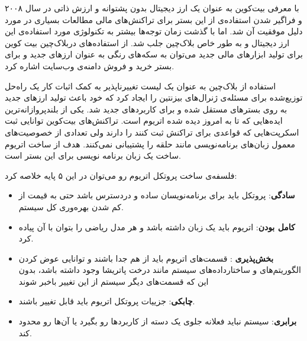 \par
با معرفی بیت‌کوین 
به عنوان یک ارز دیجیتال بدون پشتوانه و ارزش ذاتی در سال ۲۰۰۸ و فراگیر شدن استفاده‌ی از این بستر برای تراکنش‌های مالی مطالعات بسیاری در مورد دلیل موفقیت آن شد. اما با گذشت زمان توجه‌ها بیشتر به تکنولوژی مورد استفاده‌ی این ارز دیجیتال و به طور خاص بلاک‌چین
 جلب شد.
از استفاده‌های دربلاک‌چین بیت کوین برای تولید ابزارهای مالی جدید می‌توان به سکه‌های رنگی به عنوان ارزهای جدید و
  برای بستر خرید و فروش دامنه‌ی وب‌سایت اشاره کرد. 
\par
استفاده از بلاک‌چین به عنوان یک لیست تغییرناپذیر به کمک اثبات کار یک راه‌حل توزیع‌شده برای مسئله‌ی ژنرال‌های بیزنتین 
را ایجاد کرد که خود باعث تولید ارزهای جدید به روی بسترهای مستقل شده و برای کاربردهای جدید شد. یکی از بلندپروازانه‌ترین ایده‌هایی که تا به امروز دیده شده اتریوم است. تراکنش‌های بیت‌کوین توانایی ثبت اسکرپت‌هایی که قواعدی برای تراکنش ثبت کنند را دارند ولی تعدادی از خصوصیت‌های معمول زبان‌های برنامه‌نویسی
 مانند حلقه را پشتیبانی نمی‌کنند. هدف از ساخت اتریوم ساخت یک زبان برنامه نویسی
 برای این بستر است. 
\par
فلسفه‌ی ساخت پروتکل اتریوم رو می‌توان در این ۵ پایه خلاصه کرد: 
\begin{itemize}
	\item \textbf{سادگی}:
 پروتکل باید برای برنامه‌نویسان ساده و دردسترس باشد حتی به قیمت از کم شدن بهره‌وری کل سیستم.
\item  \textbf{کامل‌ بودن}:
اتریوم باید یک زبان
  داشته باشد و هر مدل ریاضی را بتوان با آن پیاده کرد. 
\item \textbf{بخش‌پذیری} :
قسمت‌های اتریوم باید از هم جدا باشند و توانایی عوض کردن الگوریتم‌های و ساختارداده‌های سیستم مانند درخت پاتریشا وجود داشته باشد، بدون این که قسمت‌های دیگر سیستم از این تغییر باخبر شوند
\item \textbf{چابکی}:
 جزییات پروتکل اتریوم باید قابل تغییر باشند. 
\item \textbf{برابری}:
سیستم نباید فعلانه جلوی یک دسته از کاربردها رو بگیرد یا آن‌ها رو محدود کند.
\end{itemize}
\par
